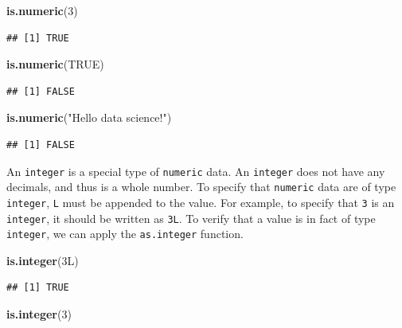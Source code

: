 \documentclass[]{book}
\newenvironment{Shaded}{\begin{snugshade}}{\end{snugshade}}
\newcommand{\KeywordTok}[1]{\textcolor[rgb]{0.13,0.29,0.53}{\textbf{#1}}}
\newcommand{\DecValTok}[1]{\textcolor[rgb]{0.00,0.00,0.81}{#1}}
\newcommand{\StringTok}[1]{\textcolor[rgb]{0.31,0.60,0.02}{#1}}
\newcommand{\OtherTok}[1]{\textcolor[rgb]{0.56,0.35,0.01}{#1}}
\newcommand{\NormalTok}[1]{#1}
\begin{document}
\begin{Shaded}
\begin{Highlighting}[]
\KeywordTok{is.numeric}\NormalTok{(}\DecValTok{3}\NormalTok{)}
\end{Highlighting}
\end{Shaded}

\begin{verbatim}
## [1] TRUE
\end{verbatim}

\begin{Shaded}
\begin{Highlighting}[]
\KeywordTok{is.numeric}\NormalTok{(}\OtherTok{TRUE}\NormalTok{)}
\end{Highlighting}
\end{Shaded}

\begin{verbatim}
## [1] FALSE
\end{verbatim}

\begin{Shaded}
\begin{Highlighting}[]
\KeywordTok{is.numeric}\NormalTok{(}\StringTok{"Hello data science!"}\NormalTok{)}
\end{Highlighting}
\end{Shaded}

\begin{verbatim}
## [1] FALSE
\end{verbatim}

An \texttt{integer} is a special type of \texttt{numeric} data. An
\texttt{integer} does not have any decimals, and thus is a whole number.
To specify that \texttt{numeric} data are of type \texttt{integer},
\texttt{L} must be appended to the value. For example, to specify that
\texttt{3} is an \texttt{integer}, it should be written as \texttt{3L}.
To verify that a value is in fact of type \texttt{integer}, we can apply
the \texttt{as.integer} function.

\begin{Shaded}
\begin{Highlighting}[]
\KeywordTok{is.integer}\NormalTok{(3L)}
\end{Highlighting}
\end{Shaded}

\begin{verbatim}
## [1] TRUE
\end{verbatim}

\begin{Shaded}
\begin{Highlighting}[]
\KeywordTok{is.integer}\NormalTok{(}\DecValTok{3}\NormalTok{)}
\end{Highlighting}
\end{Shaded}
\end{document}
